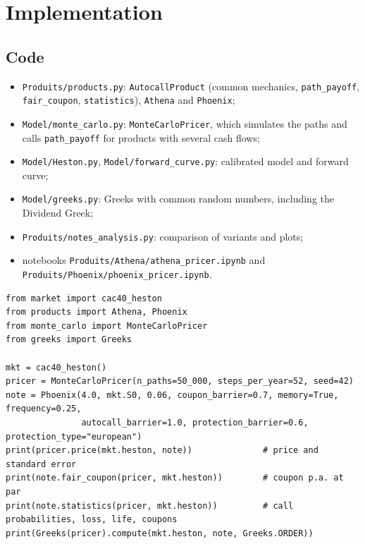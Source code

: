 \documentclass[11pt,a4paper]{article}
\newcommand{\code}[1]{\texttt{#1}}
\begin{document}
\section{Implementation}\label{sec:implementation}

\subsection{Code}
\begin{itemize}
\item \code{Produits/products.py}: \code{AutocallProduct} (common mechanics, \code{path\_payoff},
\code{fair\_coupon}, \code{statistics}), \code{Athena} and \code{Phoenix};
\item \code{Model/monte\_carlo.py}: \code{MonteCarloPricer}, which simulates the paths and calls
\code{path\_payoff} for products with several cash flows;
\item \code{Model/Heston.py}, \code{Model/forward\_curve.py}: calibrated model and forward curve;
\item \code{Model/greeks.py}: Greeks with common random numbers, including the Dividend Greek;
\item \code{Produits/notes\_analysis.py}: comparison of variants and plots;
\item notebooks \code{Produits/Athena/athena\_pricer.ipynb} and\\
\code{Produits/Phoenix/phoenix\_pricer.ipynb}.
\end{itemize}

\begin{lstlisting}
from market import cac40_heston
from products import Athena, Phoenix
from monte_carlo import MonteCarloPricer
from greeks import Greeks

mkt = cac40_heston()
pricer = MonteCarloPricer(n_paths=50_000, steps_per_year=52, seed=42)
note = Phoenix(4.0, mkt.S0, 0.06, coupon_barrier=0.7, memory=True, frequency=0.25,
               autocall_barrier=1.0, protection_barrier=0.6, protection_type="european")
print(pricer.price(mkt.heston, note))              # price and standard error
print(note.fair_coupon(pricer, mkt.heston))        # coupon p.a. at par
print(note.statistics(pricer, mkt.heston))         # call probabilities, loss, life, coupons
print(Greeks(pricer).compute(mkt.heston, note, Greeks.ORDER))
\end{lstlisting}
\end{document}
